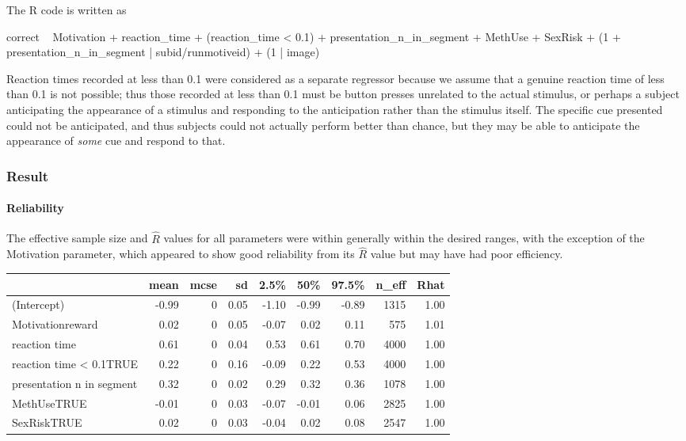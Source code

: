 \documentclass[]{article}
\newenvironment{Shaded}{\begin{snugshade}}{\end{snugshade}}
\newcommand{\DecValTok}[1]{\textcolor[rgb]{0.00,0.00,0.81}{{#1}}}
\newcommand{\FloatTok}[1]{\textcolor[rgb]{0.00,0.00,0.81}{{#1}}}
\newcommand{\StringTok}[1]{\textcolor[rgb]{0.31,0.60,0.02}{{#1}}}
\newcommand{\NormalTok}[1]{{#1}}
\let\oldparagraph\paragraph
\renewcommand{\paragraph}[1]{\oldparagraph{#1}\mbox{}}
\begin{document}
The R code is written as

\begin{Shaded}
\begin{Highlighting}[]
\NormalTok{correct ~}\StringTok{ }\NormalTok{Motivation +}\StringTok{ }\NormalTok{reaction_time +}\StringTok{ }\NormalTok{(reaction_time <}\StringTok{ }\FloatTok{0.1}\NormalTok{) +}\StringTok{ }\NormalTok{presentation_n_in_segment +}\StringTok{ }
\StringTok{    }\NormalTok{MethUse +}\StringTok{ }\NormalTok{SexRisk +}\StringTok{ }\NormalTok{(}\DecValTok{1} \NormalTok{+}\StringTok{ }\NormalTok{presentation_n_in_segment |}\StringTok{ }\NormalTok{subid/runmotiveid) +}\StringTok{ }
\StringTok{    }\NormalTok{(}\DecValTok{1} \NormalTok{|}\StringTok{ }\NormalTok{image)}
\end{Highlighting}
\end{Shaded}

Reaction times recorded at less than 0.1 were considered as a separate
regressor because we assume that a genuine reaction time of less than
0.1 is not possible; thus those recorded at less than 0.1 must be button
presses unrelated to the actual stimulus, or perhaps a subject
anticipating the appearance of a stimulus and responding to the
anticipation rather than the stimulus itself. The specific cue presented
could not be anticipated, and thus subjects could not actually perform
better than chance, but they may be able to anticipate the appearance of
\emph{some} cue and respond to that.

\subsubsection{Result}\label{result}

\paragraph{Reliability}\label{reliability}

The effective sample size and \(\hat{R}\) values for all parameters were
within generally within the desired ranges, with the exception of the
Motivation parameter, which appeared to show good reliability from its
\(\hat{R}\) value but may have had poor efficiency.

\begin{longtable}[]{@{}lrrrrrrrr@{}}
\toprule
& mean & mcse & sd & 2.5\% & 50\% & 97.5\% & n\_eff &
Rhat\tabularnewline
\midrule
\endhead
(Intercept) & -0.99 & 0 & 0.05 & -1.10 & -0.99 & -0.89 & 1315 &
1.00\tabularnewline
Motivationreward & 0.02 & 0 & 0.05 & -0.07 & 0.02 & 0.11 & 575 &
1.01\tabularnewline
reaction time & 0.61 & 0 & 0.04 & 0.53 & 0.61 & 0.70 & 4000 &
1.00\tabularnewline
reaction time \textless{} 0.1TRUE & 0.22 & 0 & 0.16 & -0.09 & 0.22 &
0.53 & 4000 & 1.00\tabularnewline
presentation n in segment & 0.32 & 0 & 0.02 & 0.29 & 0.32 & 0.36 & 1078
& 1.00\tabularnewline
MethUseTRUE & -0.01 & 0 & 0.03 & -0.07 & -0.01 & 0.06 & 2825 &
1.00\tabularnewline
SexRiskTRUE & 0.02 & 0 & 0.03 & -0.04 & 0.02 & 0.08 & 2547 &
1.00\tabularnewline
\bottomrule
\end{longtable}
\end{document}

